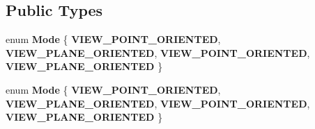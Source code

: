\subsection*{Public Types}
\begin{DoxyCompactItemize}
\item 
\mbox{\label{classBillBoard_af5c0daa78c9b4fa60562b1ed81e784df}} 
enum {\bfseries Mode} \{ {\bfseries V\+I\+E\+W\+\_\+\+P\+O\+I\+N\+T\+\_\+\+O\+R\+I\+E\+N\+T\+ED}, 
{\bfseries V\+I\+E\+W\+\_\+\+P\+L\+A\+N\+E\+\_\+\+O\+R\+I\+E\+N\+T\+ED}, 
{\bfseries V\+I\+E\+W\+\_\+\+P\+O\+I\+N\+T\+\_\+\+O\+R\+I\+E\+N\+T\+ED}, 
{\bfseries V\+I\+E\+W\+\_\+\+P\+L\+A\+N\+E\+\_\+\+O\+R\+I\+E\+N\+T\+ED}
 \}
\item 
\mbox{\label{classBillBoard_af5c0daa78c9b4fa60562b1ed81e784df}} 
enum {\bfseries Mode} \{ {\bfseries V\+I\+E\+W\+\_\+\+P\+O\+I\+N\+T\+\_\+\+O\+R\+I\+E\+N\+T\+ED}, 
{\bfseries V\+I\+E\+W\+\_\+\+P\+L\+A\+N\+E\+\_\+\+O\+R\+I\+E\+N\+T\+ED}, 
{\bfseries V\+I\+E\+W\+\_\+\+P\+O\+I\+N\+T\+\_\+\+O\+R\+I\+E\+N\+T\+ED}, 
{\bfseries V\+I\+E\+W\+\_\+\+P\+L\+A\+N\+E\+\_\+\+O\+R\+I\+E\+N\+T\+ED}
 \}
\end{DoxyCompactItemize}
